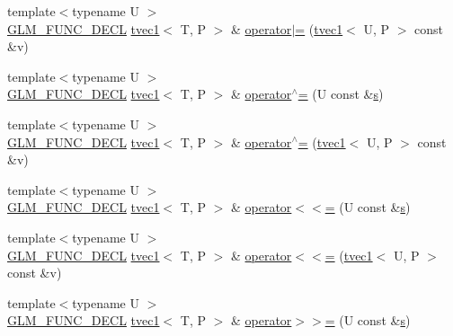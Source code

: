 \begin{DoxyCompactItemize}
\item 
{\footnotesize template$<$typename U $>$ }\\\hyperlink{setup_8hpp_ab2d052de21a70539923e9bcbf6e83a51}{G\+L\+M\+\_\+\+F\+U\+N\+C\+\_\+\+D\+E\+CL} \hyperlink{structglm_1_1detail_1_1tvec1}{tvec1}$<$ T, P $>$ \& \hyperlink{structglm_1_1detail_1_1tvec1_a15ea891a329d3a5149263d7a9fb81b40}{operator$\vert$=} (\hyperlink{structglm_1_1detail_1_1tvec1}{tvec1}$<$ U, P $>$ const \&v)
\item 
{\footnotesize template$<$typename U $>$ }\\\hyperlink{setup_8hpp_ab2d052de21a70539923e9bcbf6e83a51}{G\+L\+M\+\_\+\+F\+U\+N\+C\+\_\+\+D\+E\+CL} \hyperlink{structglm_1_1detail_1_1tvec1}{tvec1}$<$ T, P $>$ \& \hyperlink{structglm_1_1detail_1_1tvec1_ae48766d1c02e2946f6185eaac15737ef}{operator$^\wedge$=} (U const \&\hyperlink{structglm_1_1detail_1_1tvec1_a1025b03a3e1f99c7a42518af40737d7b}{s})
\item 
{\footnotesize template$<$typename U $>$ }\\\hyperlink{setup_8hpp_ab2d052de21a70539923e9bcbf6e83a51}{G\+L\+M\+\_\+\+F\+U\+N\+C\+\_\+\+D\+E\+CL} \hyperlink{structglm_1_1detail_1_1tvec1}{tvec1}$<$ T, P $>$ \& \hyperlink{structglm_1_1detail_1_1tvec1_a03d26aae5b039d37df678fe8648efbb8}{operator$^\wedge$=} (\hyperlink{structglm_1_1detail_1_1tvec1}{tvec1}$<$ U, P $>$ const \&v)
\item 
{\footnotesize template$<$typename U $>$ }\\\hyperlink{setup_8hpp_ab2d052de21a70539923e9bcbf6e83a51}{G\+L\+M\+\_\+\+F\+U\+N\+C\+\_\+\+D\+E\+CL} \hyperlink{structglm_1_1detail_1_1tvec1}{tvec1}$<$ T, P $>$ \& \hyperlink{structglm_1_1detail_1_1tvec1_a52cec716d59902c6a42eeebd28f78de9}{operator$<$$<$=} (U const \&\hyperlink{structglm_1_1detail_1_1tvec1_a1025b03a3e1f99c7a42518af40737d7b}{s})
\item 
{\footnotesize template$<$typename U $>$ }\\\hyperlink{setup_8hpp_ab2d052de21a70539923e9bcbf6e83a51}{G\+L\+M\+\_\+\+F\+U\+N\+C\+\_\+\+D\+E\+CL} \hyperlink{structglm_1_1detail_1_1tvec1}{tvec1}$<$ T, P $>$ \& \hyperlink{structglm_1_1detail_1_1tvec1_a12d03301e51ece6466714a8203f8b237}{operator$<$$<$=} (\hyperlink{structglm_1_1detail_1_1tvec1}{tvec1}$<$ U, P $>$ const \&v)
\item 
{\footnotesize template$<$typename U $>$ }\\\hyperlink{setup_8hpp_ab2d052de21a70539923e9bcbf6e83a51}{G\+L\+M\+\_\+\+F\+U\+N\+C\+\_\+\+D\+E\+CL} \hyperlink{structglm_1_1detail_1_1tvec1}{tvec1}$<$ T, P $>$ \& \hyperlink{structglm_1_1detail_1_1tvec1_a19aaf3b4350fe2a5c245775e4fa4d80c}{operator$>$$>$=} (U const \&\hyperlink{structglm_1_1detail_1_1tvec1_a1025b03a3e1f99c7a42518af40737d7b}{s})

\end{DoxyCompactItemize}
